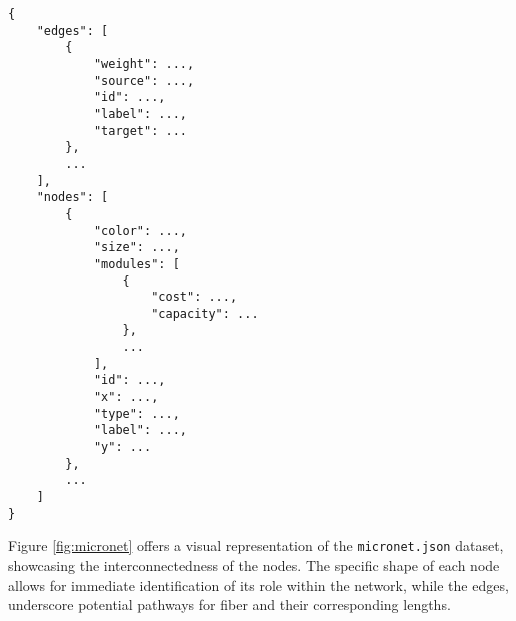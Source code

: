 \documentclass{article}
\begin{document}
\begin{lstlisting}[basicstyle=\ttfamily, frame=single,caption={JSON Structure},label=lst:jsonstructure]
{
    "edges": [
        {
            "weight": ...,
            "source": ...,
            "id": ...,
            "label": ...,
            "target": ...
        },
        ...
    ],
    "nodes": [
        {
            "color": ...,
            "size": ...,
            "modules": [
                {
                    "cost": ...,
                    "capacity": ...
                },
                ...
            ],
            "id": ...,
            "x": ...,
            "type": ...,
            "label": ...,
            "y": ...
        },
        ...
    ]
}
\end{lstlisting}
Figure \ref{fig:micronet} offers a visual representation of the \texttt{micronet.json} dataset, showcasing the interconnectedness of the nodes. The specific shape of each node allows for immediate identification of its role within the network, while the edges, underscore potential pathways for fiber and their corresponding lengths.
\end{document}
